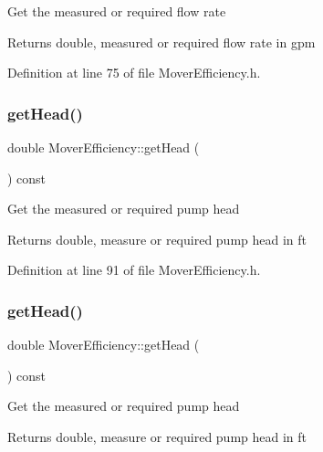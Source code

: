 Get the measured or required flow rate \begin{DoxyReturn}{Returns}
double, measured or required flow rate in gpm 
\end{DoxyReturn}


Definition at line 75 of file Mover\+Efficiency.\+h.

\mbox{\label{class_mover_efficiency_a9ce5f2dba38ae4f271bdb2c018667144}} 
\subsubsection{\texorpdfstring{get\+Head()}{getHead()}\hspace{0.1cm}{\footnotesize\ttfamily [1/3]}}
{\footnotesize\ttfamily double Mover\+Efficiency\+::get\+Head (\begin{DoxyParamCaption}{ }\end{DoxyParamCaption}) const\hspace{0.3cm}{\ttfamily [inline]}}

Get the measured or required pump head \begin{DoxyReturn}{Returns}
double, measure or required pump head in ft 
\end{DoxyReturn}


Definition at line 91 of file Mover\+Efficiency.\+h.

\mbox{\label{class_mover_efficiency_a9ce5f2dba38ae4f271bdb2c018667144}} 
\subsubsection{\texorpdfstring{get\+Head()}{getHead()}\hspace{0.1cm}{\footnotesize\ttfamily [2/3]}}
{\footnotesize\ttfamily double Mover\+Efficiency\+::get\+Head (\begin{DoxyParamCaption}{ }\end{DoxyParamCaption}) const\hspace{0.3cm}{\ttfamily [inline]}}

Get the measured or required pump head \begin{DoxyReturn}{Returns}
double, measure or required pump head in ft 
\end{DoxyReturn}


